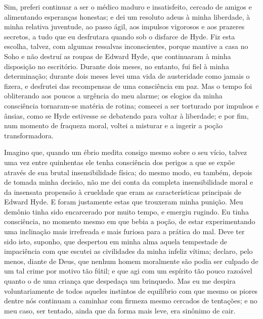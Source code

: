Sim, preferi continuar a ser o médico maduro e insatisfeito, cercado de
amigos e alimentando esperanças honestas; e dei um resoluto adeus à
minha liberdade, à minha relativa juventude, ao passo ágil, aos
impulsos vigorosos e aos prazeres secretos, a tudo que eu desfrutara
quando sob o disfarce de Hyde.  Fiz esta escolha, talvez, com algumas
ressalvas inconscientes, porque mantive a casa no Soho e não destruí as
roupas de Edward Hyde, que continuaram à minha disposição no
escritório.  Durante dois meses, no entanto, fui fiel à minha
determinação; durante dois meses levei uma vida de austeridade como
jamais o fizera, e desfrutei das recompensas de uma consciência em paz.
 Mas o tempo foi obliterando aos poucos a urgência do meu alarme; os
elogios da minha consciência tornaram-se matéria de rotina; comecei a
ser torturado por impulsos e ânsias, como se Hyde estivesse se
debatendo para voltar à liberdade; e por fim, num momento de fraqueza
moral, voltei a misturar e a ingerir a poção transformadora.

Imagino que, quando um ébrio medita consigo mesmo sobre o seu vício,
talvez uma vez entre quinhentas ele tenha consciência dos perigos a que
se expõe através de sua brutal insensibilidade física; do mesmo modo,
eu também, depois de tomada minha decisão, não me dei conta da completa
insensibilidade moral e da insensata propensão à crueldade que eram as
características principais de Edward Hyde.  E foram justamente estas
que trouxeram minha punição.  Meu demônio tinha sido encarcerado por
muito tempo, e emergiu rugindo.  Eu tinha consciência, no momento mesmo
em que bebia a poção, de estar experimentando uma inclinação mais
irrefreada e mais furiosa para a prática do mal.  Deve ter sido isto,
suponho, que despertou em minha alma aquela tempestade de impaciência
com que escutei as civilidades da minha infeliz vítima; declaro, pelo
menos, diante de Deus, que nenhum homem moralmente são podia ser
culpado de um tal crime por motivo tão fútil; e que agi com um espírito
tão pouco razoável quanto o de uma criança que despedaça um brinquedo. 
Mas eu me despira voluntariamente de todos aqueles instintos de
equilíbrio com que mesmo os piores dentre nós continuam a caminhar com
firmeza mesmo cercados de tentações; e no meu caso, ser tentado, ainda
que da forma mais leve, era sinônimo de cair.


